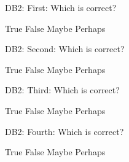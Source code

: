 %
%


\begin{rtVW}
\begin{problem}[5]
DB2: First: Which is correct?
\begin{answers}{4}
\bChoices[nCols=2,random]
     True\eAns
     False\eAns
     Maybe\eAns
     Perhaps\eAns
\eChoices
\end{answers}
\end{problem}
\end{rtVW}

\begin{rtVW}
\begin{problem}[5]
DB2: Second: Which is correct?
\begin{answers}{4}
\bChoices[nCols=2,random]
     True\eAns
     False\eAns
     Maybe\eAns
     Perhaps\eAns
\eChoices
\end{answers}
\end{problem}
\end{rtVW}

\begin{rtVW}
\begin{problem}[5]
DB2: Third: Which is correct?
\begin{answers}{4}
\bChoices[nCols=2,random]
     True\eAns
     False\eAns
     Maybe\eAns
     Perhaps\eAns
\eChoices
\end{answers}
\end{problem}
\end{rtVW}

\begin{rtVW}
\begin{problem}[5]
DB2: Fourth: Which is correct?
\begin{answers}{4}
\bChoices[nCols=2,random]
     True\eAns
     False\eAns
     Maybe\eAns
     Perhaps\eAns
\eChoices
\end{answers}
\end{problem}
\end{rtVW}

\eRTVToks

\endinput